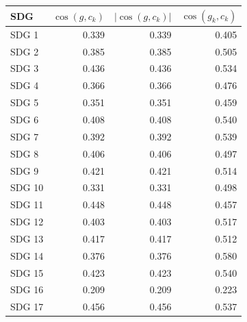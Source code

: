 \begin{tabular}{lrrr}
\toprule
SDG & $\cos(g, c_k)$ & $|\cos(g, c_k)|$ & $\cos(g_k, c_k)$ \\
\midrule
SDG 1 & 0.339 & 0.339 & 0.405 \\
SDG 2 & 0.385 & 0.385 & 0.505 \\
SDG 3 & 0.436 & 0.436 & 0.534 \\
SDG 4 & 0.366 & 0.366 & 0.476 \\
SDG 5 & 0.351 & 0.351 & 0.459 \\
SDG 6 & 0.408 & 0.408 & 0.540 \\
SDG 7 & 0.392 & 0.392 & 0.539 \\
SDG 8 & 0.406 & 0.406 & 0.497 \\
SDG 9 & 0.421 & 0.421 & 0.514 \\
SDG 10 & 0.331 & 0.331 & 0.498 \\
SDG 11 & 0.448 & 0.448 & 0.457 \\
SDG 12 & 0.403 & 0.403 & 0.517 \\
SDG 13 & 0.417 & 0.417 & 0.512 \\
SDG 14 & 0.376 & 0.376 & 0.580 \\
SDG 15 & 0.423 & 0.423 & 0.540 \\
SDG 16 & 0.209 & 0.209 & 0.223 \\
SDG 17 & 0.456 & 0.456 & 0.537 \\
\bottomrule
\end{tabular}
